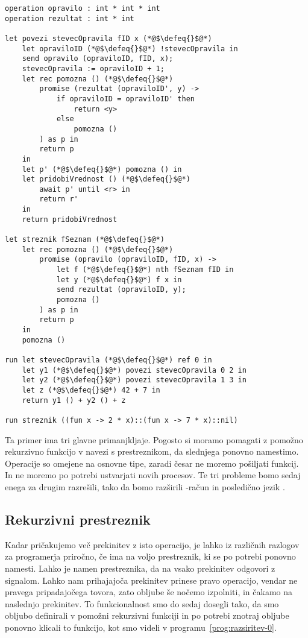 \begin{lstlisting}[caption={Računanje zahtevne funkcije v ozadju.},label={prog:razsiritev-0},float,floatplacement=h]
operation opravilo : int * int * int
operation rezultat : int * int

let povezi stevecOpravila fID x (*@$\defeq{}$@*)
    let opraviloID (*@$\defeq{}$@*) !stevecOpravila in
    send opravilo (opraviloID, fID, x);
    stevecOpravila := opraviloID + 1;
    let rec pomozna () (*@$\defeq{}$@*)
    	promise (rezultat (opraviloID', y) ->
    		if opraviloID = opraviloID' then
    			return <y>
    		else
    			pomozna ()
    	) as p in
    	return p
    in
    let p' (*@$\defeq{}$@*) pomozna () in
    let pridobiVrednost () (*@$\defeq{}$@*)
    	await p' until <r> in
    	return r'
    in
    return pridobiVrednost

let streznik fSeznam (*@$\defeq{}$@*)
    let rec pomozna () (*@$\defeq{}$@*)
    	promise (opravilo (opraviloID, fID, x) ->
    		let f (*@$\defeq{}$@*) nth fSeznam fID in
    		let y (*@$\defeq{}$@*) f x in
    		send rezultat (opraviloID, y);
    		pomozna ()
    	) as p in
    	return p
    in
    pomozna ()

run	let stevecOpravila (*@$\defeq{}$@*) ref 0 in
    let y1 (*@$\defeq{}$@*) povezi stevecOpravila 0 2 in
    let y2 (*@$\defeq{}$@*) povezi stevecOpravila 1 3 in
    let z (*@$\defeq{}$@*) 42 + 7 in
    return y1 () + y2 () + z

run streznik ((fun x -> 2 * x)::(fun x -> 7 * x)::nil)
\end{lstlisting}


Ta primer ima tri glavne primanjkljaje. Pogosto si moramo pomagati z pomožno rekurzivno funkcijo v navezi s prestreznikom, da slednjega ponovno namestimo. Operacije so omejene na osnovne tipe, zaradi česar ne moremo pošiljati funkcij. In ne moremo po potrebi ustvarjati novih procesov.
Te tri probleme bomo sedaj enega za drugim razrešili, tako da bomo razširili \lae{}-račun in posledično jezik \aeff{}.


\subsection{Rekurzivni prestreznik}


Kadar pričakujemo več prekinitev z isto operacijo, je lahko iz različnih razlogov za programerja priročno, če ima na voljo prestreznik, ki se po potrebi ponovno namesti. Lahko je namen prestreznika, da na vsako prekinitev odgovori z signalom. Lahko nam prihajajoča prekinitev prinese pravo operacijo, vendar ne pravega pripadajočega tovora, zato obljube še nočemo izpolniti, in čakamo na naslednjo prekinitev.
To funkcionalnost smo do sedaj dosegli tako, da smo obljubo definirali v pomožni rekurzivni funkciji in po potrebi znotraj obljube ponovno klicali to funkcijo, kot smo videli v programu~\ref{prog:razsiritev-0}.

